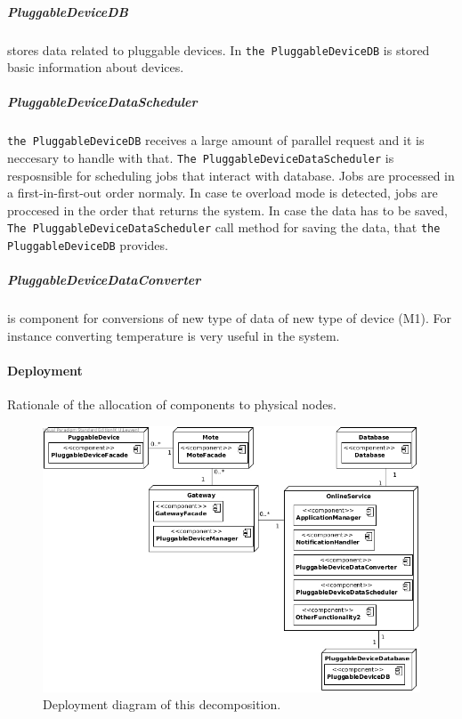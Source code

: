     \subparagraph{PluggableDeviceDB}
        stores data related to pluggable devices. In \texttt{the PluggableDeviceDB}
        is stored basic information about devices.

    \subparagraph{PluggableDeviceDataScheduler}
        \texttt{the PluggableDeviceDB} receives a large amount of parallel request
        and it is neccesary to handle with that. 
        \texttt{The PluggableDeviceDataScheduler} is resposnsible for scheduling jobs
        that interact with database. Jobs are processed in a first-in-first-out order normaly.
        In case te overload mode is detected, jobs are proccesed in  the  order  
        that  returns  the  system. In case the data has to be saved,
        \texttt{The PluggableDeviceDataScheduler} call method for saving the data, that
         \texttt{the PluggableDeviceDB} provides.
        

    \subparagraph{PluggableDeviceDataConverter}
       is component for conversions of new type of data of new type of device (M1).
       For instance converting temperature is very useful in the system.
       


    \paragraph{Deployment}
        Rationale of the allocation of components to physical nodes.

        \begin{figure}[!htp]
        	\centering
        	\includegraphics[width=1.00\textwidth]{deployment-diagram-2}
        	\caption{Deployment diagram of this decomposition.
        	}\label{fig:it1-depl_main}
        \end{figure}


